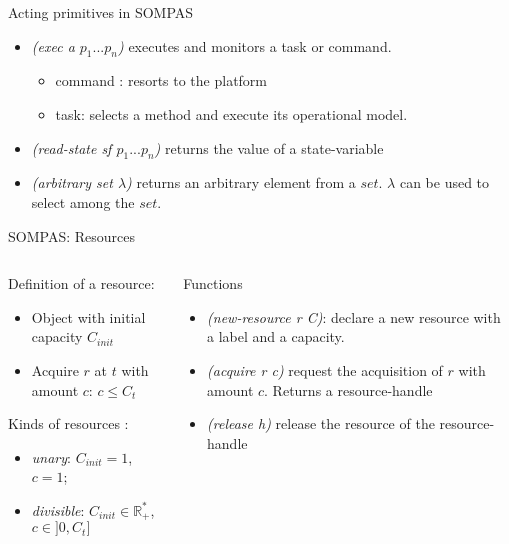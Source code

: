     

\begin{frame}{Acting primitives in SOMPAS}
    \begin{itemize}
    \pause
        \item \textit{(exec a $p_1...p_n$)} executes and monitors a task or command.
    \pause
        \begin{itemize}
            \item command : resorts to the platform
            \item task: selects a method and execute its operational model.
        \end{itemize}
    \pause
        \item \textit{(read-state sf $p_1...p_n$)} returns the value of a state-variable
        \item \textit{(arbitrary set $\lambda$)} returns an arbitrary element from a $set$. $\lambda$ can be used to select among the $set$.
    \end{itemize}
\end{frame}

\begin{frame}[t]{SOMPAS: Resources}
    \begin{columns}
        \begin{column}{0.5\textwidth}
            Definition of a resource:
            \begin{itemize}
                \item Object with initial capacity $C_{init}$
                \item Acquire $r$ at $t$ with amount $c$: $c \leq C_t$ 
            \end{itemize}
            Kinds of resources : 
            \begin{itemize}
                \item \emph{unary}: $C_{init} = 1$, $c = 1$;
                \item \emph{divisible}: $C_{init} \in  \mathbb{R}_+^*$, $c \in ]0, C_t]$
            \end{itemize}
        \end{column}
        \begin{column}{0.5\textwidth}
            Functions
            \begin{itemize}
                \item \textit{(new-resource r C)}: declare a new resource with a label and a capacity.
                \item \emph{(acquire r c)} request the acquisition of $r$ with amount $c$. Returns a resource-handle
                \item \emph{(release h)} release the resource of the resource-handle
            \end{itemize}
        \end{column}
    \end{columns}
\end{frame}

